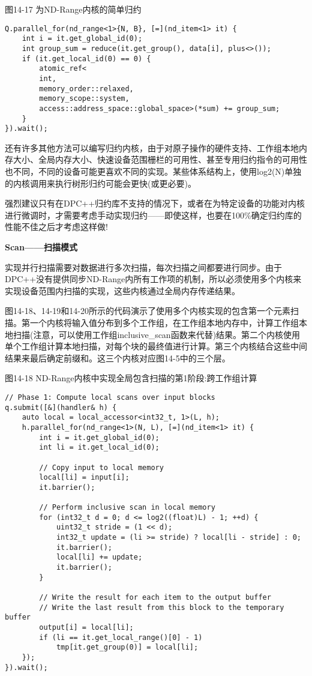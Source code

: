 \hspace*{\fill} \par %
图14-17 为ND-Range内核的简单归约
\begin{lstlisting}[caption={}]
Q.parallel_for(nd_range<1>{N, B}, [=](nd_item<1> it) {
	int i = it.get_global_id(0);
	int group_sum = reduce(it.get_group(), data[i], plus<>());
	if (it.get_local_id(0) == 0) {
		atomic_ref<
		int,
		memory_order::relaxed,
		memory_scope::system,
		access::address_space::global_space>(*sum) += group_sum;
	}
}).wait();
\end{lstlisting}

还有许多其他方法可以编写归约内核，由于对原子操作的硬件支持、工作组本地内存大小、全局内存大小、快速设备范围栅栏的可用性、甚至专用归约指令的可用性也不同，不同的设备可能更喜欢不同的实现。某些体系结构上，使用log2(N)单独的内核调用来执行树形归约可能会更快(或更必要)。\par

强烈建议只有在DPC++归约库不支持的情况下，或者在为特定设备的功能对内核进行微调时，才需要考虑手动实现归约——即使这样，也要在100\%确定归约库的性能不佳之后才考虑这样做!\par

\hspace*{\fill} \par %
\textbf{Scan——扫描模式}

实现并行扫描需要对数据进行多次扫描，每次扫描之间都要进行同步。由于DPC++没有提供同步ND-Range内所有工作项的机制，所以必须使用多个内核来实现设备范围内扫描的实现，这些内核通过全局内存传递结果。\par

图14-18、14-19和14-20所示的代码演示了使用多个内核实现的包含第一个元素扫描。第一个内核将输入值分布到多个工作组，在工作组本地内存中，计算工作组本地扫描(注意，可以使用工作组inclusive\_scan函数来代替)结果。第二个内核使用单个工作组计算本地扫描，对每个块的最终值进行计算。第三个内核结合这些中间结果来最后确定前缀和。这三个内核对应图14-5中的三个层。\par

\hspace*{\fill} \par %
图14-18 ND-Range内核中实现全局包含扫描的第1阶段:跨工作组计算
\begin{lstlisting}[caption={}]
// Phase 1: Compute local scans over input blocks
q.submit([&](handler& h) {
	auto local = local_accessor<int32_t, 1>(L, h);
	h.parallel_for(nd_range<1>(N, L), [=](nd_item<1> it) {
		int i = it.get_global_id(0);
		int li = it.get_local_id(0);
		
		// Copy input to local memory
		local[li] = input[i];
		it.barrier();
		
		// Perform inclusive scan in local memory
		for (int32_t d = 0; d <= log2((float)L) - 1; ++d) {
			uint32_t stride = (1 << d);
			int32_t update = (li >= stride) ? local[li - stride] : 0;
			it.barrier();
			local[li] += update;
			it.barrier();
		}
	
		// Write the result for each item to the output buffer
		// Write the last result from this block to the temporary buffer
		output[i] = local[li];
		if (li == it.get_local_range()[0] - 1)
			tmp[it.get_group(0)] = local[li];
	});
}).wait();
\end{lstlisting}


